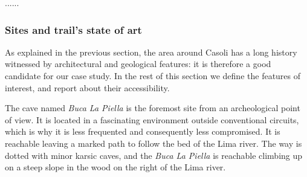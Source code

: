 \documentclass[sustainability,article,submit,pdftex,moreauthors]{Definitions/mdpi}
\begin{document}
......

\subsubsection{Sites and trail’s state of art}


As explained in the previous section, the area around Casoli has a long history witnessed by architectural and geological features: it is therefore a good candidate for our case study. In the rest of this section we define the features of interest, and report about their accessibility.


The cave named {\em Buca La Piella} is the foremost site from an archeological point of view. It is located in a fascinating environment outside conventional circuits, which is why it is less frequented and consequently less compromised. It is reachable leaving a marked path to follow the bed of the Lima river. The way is dotted with minor karsic caves, and the {\em Buca La Piella} is reachable climbing up on a steep slope in the wood on the right of the Lima river. 

\end{document}
